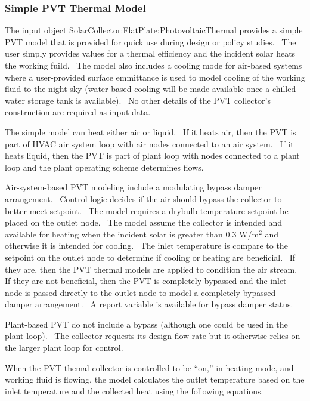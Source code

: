 \subsubsection{Simple PVT Thermal Model}\label{simple-pvt-thermal-model}

The input object SolarCollector:FlatPlate:PhotovoltaicThermal provides a simple PVT model that is provided for quick use during design or policy studies.~ The user simply provides values for a thermal efficiency and the incident solar heats the working fuild.~ The model also includes a cooling mode for air-based systems where a user-provided surface emmittance is used to model cooling of the working fluid to the night sky (water-based cooling will be made available once a chilled water storage tank is available).~ No other details of the PVT collector's construction are required as input data.

The simple model can heat either air or liquid.~ If it heats air, then the PVT is part of HVAC air system loop with air nodes connected to an air system.~ If it heats liquid, then the PVT is part of plant loop with nodes connected to a plant loop and the plant operating scheme determines flows.

Air-system-based PVT modeling include a modulating bypass damper arrangement.~ Control logic decides if the air should bypass the collector to better meet setpoint.~ The model requires a drybulb temperature setpoint be placed on the outlet node.~ The model assume the collector is intended and available for heating when the incident solar is greater than 0.3 W/m\(^{2}\) and otherwise it is intended for cooling.~ The inlet temperature is compare to the setpoint on the outlet node to determine if cooling or heating are beneficial.~ If they are, then the PVT thermal models are applied to condition the air stream.~ If they are not beneficial, then the PVT is completely bypassed and the inlet node is passed directly to the outlet node to model a completely bypassed damper arrangement.~ A report variable is available for bypass damper status.

Plant-based PVT do not include a bypass (although one could be used in the plant loop).~ The collector requests its design flow rate but it otherwise relies on the larger plant loop for control.

When the PVT themal collector is controlled to be ``on,'' in heating mode, and working fluid is flowing, the model calculates the outlet temperature based on the inlet temperature and the collected heat using the following equations.

